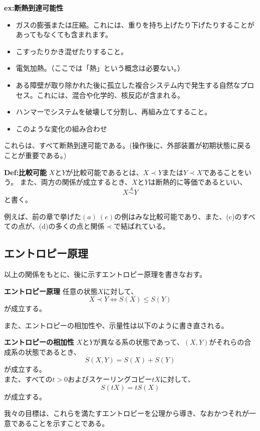 \documentclass[a4paper,11pt]{jsarticle}
\begin{document}
\textbf{ex:断熱到達可能性}\\
\begin{itemize}
    \item ガスの膨張または圧縮。これには、重りを持ち上げたり下げたりすることがあってもなくても含まれます。
    \item こすったりかき混ぜたりすること。
    \item 電気加熱。（ここでは「熱」という概念は必要ない。）
    \item ある障壁が取り除かれた後に孤立した複合システム内で発生する自然なプロセス。これには、混合や化学的、核反応が含まれる。
    \item ハンマーでシステムを破壊して分割し、再組み立てすること。
    \item このような変化の組み合わせ
\end{itemize}
これらは、すべて断熱到達可能である。(操作後に、外部装置が初期状態に戻ることが重要である。)\\

\begin{itembox}[l]{\textbf{Def:比較可能}}
    $X$と$Y$が比較可能であるとは、$X \prec Y$または$Y \prec X$であることをいう。
    また、両方の関係が成立するとき、$X$と$Y$は断熱的に等価であるといい、
    \begin{equation}
        X \overset{A}{\sim} Y
    \end{equation}
    と書く。

\end{itembox}
例えば、前の章で挙げた$(a)~(e)$の例はみな比較可能であり、また、(c)のすべての点が、(d)の多くの点と関係$\prec$で結ばれている。\\

\subsection{エントロピー原理}
以上の関係をもとに、後に示すエントロピー原理を書きなおす。
\begin{itembox}[l]{\textbf{エントロピー原理}}
    任意の状態$X$に対して、
    \begin{equation}
        X \prec Y \Leftrightarrow S(X) \leq S(Y)
    \end{equation}
    が成立する。
\end{itembox}
また、エントロピーの相加性や、示量性は以下のように書き直される。
\begin{itembox}[l]{\textbf{エントロピーの相加性}}
    $X$と$Y$が異なる系の状態であって、$(X,Y)$がそれらの合成系の状態であるとき、
    \begin{equation}
        S(X,Y)=S(X)+S(Y)
    \end{equation}
    が成立する。\\
    また、すべての$t>0$およびスケーリングコピー$tX$に対して、
    \begin{equation}
        S(tX)=tS(X)
    \end{equation}
    が成立する。
\end{itembox}
我々の目標は、これらを満たすエントロピーを公理から導き、なおかつそれが一意であることを示すことである。\\
\end{document}
